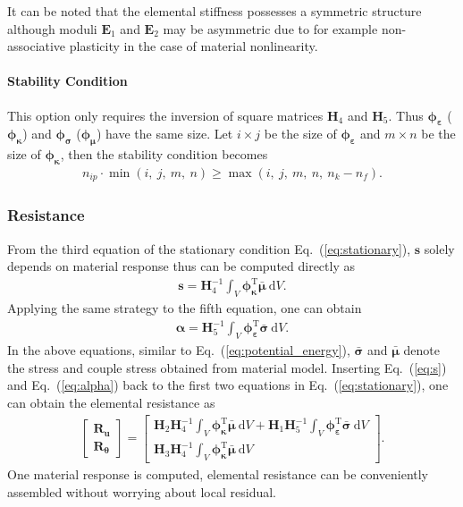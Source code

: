 \documentclass[3p,sort&compress,11pt,fleqn]{elsarticle}
\newcommand*{\eqsref}[1]{Eq.~(\ref{#1})}
\newcommand*{\mT}{\mathrm{T}}
\newcommand*{\md}[1]{\mathrm{d}#1}
\begin{document}
It can be noted that the elemental stiffness possesses a symmetric structure although moduli $\mathbold{E}_1$ and $\mathbold{E}_2$ may be asymmetric due to for example non-associative plasticity in the case of material nonlinearity.
\paragraph{Stability Condition}
This option only requires the inversion of square matrices $\mathbold{H}_4$ and $\mathbold{H}_5$. Thus $\mathbold{\phi}_\mathbold{\varepsilon}$ ($\mathbold{\phi}_\mathbold{\kappa}$) and $\mathbold{\phi}_\mathbold{\sigma}$ ($\mathbold{\phi}_\mathbold{\mu}$) have the same size. Let $i\times{}j$ be the size of $\mathbold{\phi}_\mathbold{\varepsilon}$ and $m\times{}n$ be the size of $\mathbold{\phi}_\mathbold{\kappa}$, then the stability condition becomes
\begin{gather}\label{eq:stability2}
n_{ip}\cdot{}\min\left(i,~j,~m,~n\right)\geqslant{}\max\left(i,~j,~m,~n,~n_k-n_f\right).
\end{gather}
\subsubsection{Resistance}
From the third equation of the stationary condition \eqsref{eq:stationary}, $\mathbold{s}$ solely depends on material response thus can be computed directly as
\begin{gather}\label{eq:s}
\mathbold{s}=\mathbold{H}_4^{-1}\int_V\mathbold{\phi}_\mathbold{\kappa}^\mT{}\bar{\mathbold{\mu}}~\md{V}.
\end{gather}
Applying the same strategy to the fifth equation, one can obtain
\begin{gather}\label{eq:alpha}
\mathbold{\alpha}=\mathbold{H}_5^{-1}\int_V\mathbold{\phi}_\mathbold{\varepsilon}^\mT{}\bar{\mathbold{\sigma}}~\md{V}.
\end{gather}
In the above equations, similar to \eqsref{eq:potential_energy}, $\bar{\mathbold{\sigma}}$ and $\bar{\mathbold{\mu}}$ denote the stress and couple stress obtained from material model. Inserting \eqsref{eq:s} and \eqsref{eq:alpha} back to the first two equations in \eqsref{eq:stationary}, one can obtain the elemental resistance as
\begin{gather}
\begin{bmatrix}
\mathbold{R}_\mathbold{u}\\\mathbold{R}_\mathbold{\theta}
\end{bmatrix}=\begin{bmatrix}
\displaystyle\mathbold{H}_2\mathbold{H}_4^{-1}\int_V\mathbold{\phi}_\mathbold{\kappa}^\mT{}\bar{\mathbold{\mu}}~\md{V}+\mathbold{H}_1\mathbold{H}_5^{-1}\int_V\mathbold{\phi}_\mathbold{\varepsilon}^\mT{}\bar{\mathbold{\sigma}}~\md{V}\\
\displaystyle\mathbold{H}_3\mathbold{H}_4^{-1}\int_V\mathbold{\phi}_\mathbold{\kappa}^\mT{}\bar{\mathbold{\mu}}~\md{V}
\end{bmatrix}.
\end{gather}
One material response is computed, elemental resistance can be conveniently assembled without worrying about local residual.
\end{document}
